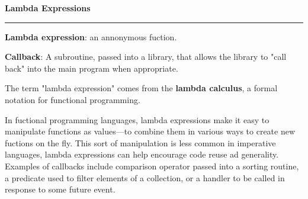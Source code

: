 \nopagenumbers
{\bf Lambda Expressions}
\vskip 1mm
\hrule

\vskip 6pt
{\bf Lambda expression}: an annonymous fuction.

\vskip 6pt
{\bf Callback}: A subroutine, passed into a library, that allows the library to "call back" into the main program when appropriate.

\vskip 6pt
The term "lambda expression" comes from the {\bf lambda calculus}, a formal notation for functional programming.

\vskip 6pt
In fuctional programming languages, lambda expressions make it easy to manipulate functions as values---to combine them in various ways to create new fuctions on the fly. This sort of manipulation is less common in imperative languages, lambda expressions can help encourage code reuse ad generality. Examples of callbacks include comparison operator passed into a sorting routine, a predicate used to filter elements of a collection, or a handler to be called in response to some future event.



\vfill\eject
\bye
